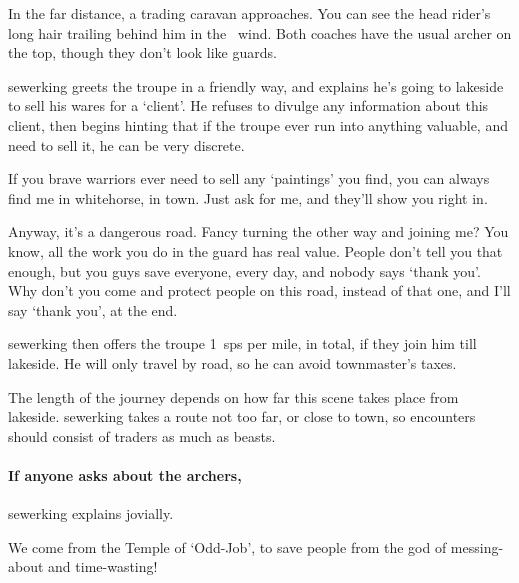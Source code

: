 \begin{boxtext}
  In the far distance, a trading caravan approaches.
  You can see the head rider's long hair trailing behind him in the \showTemperature\ wind.
  Both coaches have the usual archer on the top, though they don't look like \glspl{guard}.
\end{boxtext}

\setcounter{wounds}{2}

\sewerking


\Gls{sewerking} greets the troupe in a friendly way, and explains he's going to \gls{lakeside} to sell his wares for a `client'.
He refuses to divulge any information about this client, then begins hinting that if the troupe ever run into anything valuable, and need to sell it, he can be very discrete.

\begin{speechtext}
  If you brave warriors ever need to sell any `paintings' you find, you can always find me in \gls{whitehorse}, in \gls{town}.
  Just ask for me, and they'll show you right in.

  Anyway, it's a dangerous road.
  Fancy turning the other way and joining me?
  You know, all the work you do in the \gls{guard} has real value.
  People don't tell you that enough, but you guys save everyone, every day, and nobody says `thank you'.
  Why don't you come and protect people on this road, instead of that one, and I'll say `thank you', at the end.
\end{speechtext}

\Gls{sewerking} then offers the troupe 1~\glspl{sp} per mile, in total, if they join him till \gls{lakeside}.
He will only travel by road, so he can avoid \gls{townmaster}'s taxes.

The length of the journey depends on how far this scene takes place from \gls{lakeside}.
\Gls{sewerking} takes a route not too far, or close to town, so encounters should consist of traders as much as beasts.

\paragraph{If anyone asks about the archers,}
\gls{sewerking} explains jovially.

\begin{speechtext}
  We come from the Temple of `Odd-Job', to save people from the god of messing-about and time-wasting!%
\end{speechtext}

